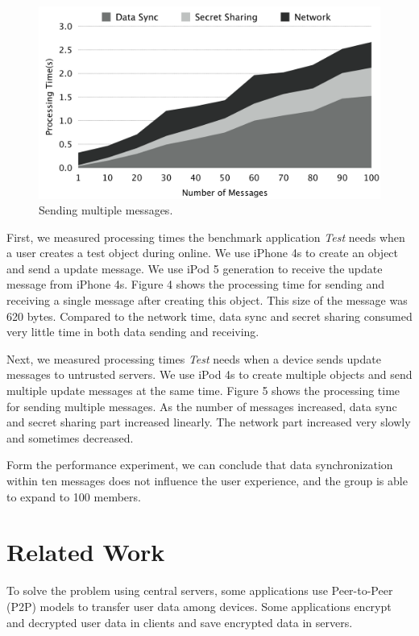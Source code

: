 \documentclass[twocolumn,10pt]{article}
\begin{document}
\begin{figure}[t]
	\centering
	\includegraphics[scale=0.12]{processing2}
	\caption{Sending multiple messages.}
\end{figure}

First, we measured processing times the benchmark application \emph{Test} needs when a user creates a test object during online. 
We use iPhone 4s to create an object and send a update message. 
We use iPod 5 generation to receive the update message from iPhone 4s.
Figure 4 shows the processing time for sending and receiving a single message after creating this object.
This size of the message was 620 bytes.
Compared to the network time, data sync and secret sharing consumed very little time in both data sending and receiving.

Next, we measured processing times \emph{Test} needs when a device sends update messages to untrusted servers.
We use iPod 4s to create multiple objects and send multiple update messages at the same time.
Figure 5 shows the processing time for sending multiple messages. 
As the number of messages increased, data sync and secret sharing part increased linearly. 
The network part increased very slowly and sometimes decreased.

Form the performance experiment, we can conclude that data synchronization within ten messages does not influence the user experience, and the group is able to expand to 100 members. 

\section{Related Work}

To solve the problem using central servers, some applications use Peer-to-Peer (P2P) models to transfer user data among devices. 
Some applications encrypt and decrypted user data in clients and save encrypted data in servers. 
\end{document}
